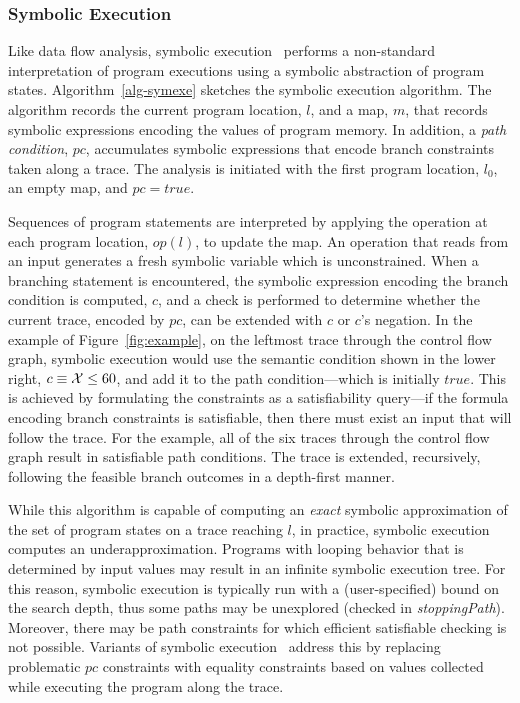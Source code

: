 \subsubsection{Symbolic Execution}
Like data flow analysis, symbolic execution~\cite{king1976symbolic,clarke1976system} 
performs a non-standard interpretation of program executions using 
a symbolic abstraction of program states.
Algorithm~\ref{alg-symexe} sketches the symbolic execution algorithm.
The algorithm records the current program location, $l$,
and a map, $m$, that records symbolic expressions encoding the
values of program memory.  In addition, a \textit{path condition}, $pc$,
accumulates symbolic expressions that encode branch constraints 
taken along a trace.  The analysis is initiated with the first
program location, $l_0$, an empty map, and $pc = true$.

Sequences of program statements are interpreted by applying the operation
at each program location, $op(l)$, to update the map.  
An operation that reads from an input generates a fresh symbolic
variable which is unconstrained.  
When a branching statement is encountered, the symbolic expression encoding
the branch condition is computed, $c$, and a check is performed
to determine whether the current trace, encoded by $pc$, can be
extended with $c$ or $c$'s negation.  
In the example of Figure~\ref{fig:example}, on the leftmost trace through
the control flow graph, symbolic execution would use the semantic
condition shown in the lower right, $c \equiv {\cal X} \le 60$,
and add it to the path condition---which is initially $true$.
This is achieved by formulating the constraints
as a satisfiability query---if the formula encoding branch constraints
is satisfiable, then there must exist an input that will follow the trace.
For the example, all of the six traces through the control flow graph 
result in satisfiable path conditions.
The trace is extended, recursively, following the feasible branch outcomes
in a depth-first manner.

While this algorithm is capable of computing an \textit{exact} symbolic
approximation of the set of program states on a trace reaching $l$, in
practice, symbolic execution computes an underapproximation.
Programs with looping behavior that is determined by input values 
may result in an infinite symbolic execution tree. 
For this reason, symbolic execution is
typically run with a (user-specified) bound on the search depth, thus
some paths may be unexplored (checked in {\it stoppingPath}).   Moreover, there may be path constraints
for which efficient satisfiable checking is not possible.  Variants of
symbolic execution~\cite{godefroid2005dart,sen2005cute,song2008bitblaze} 
address this by replacing problematic $pc$ constraints with equality
constraints based on values collected while executing the program along the trace.

